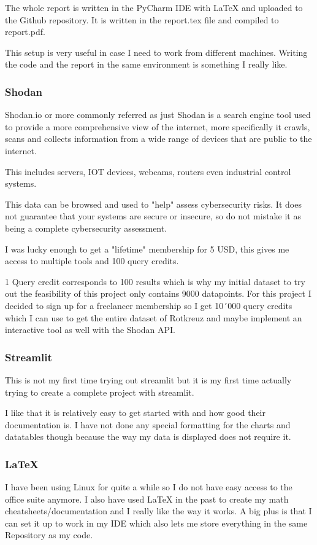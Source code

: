 \documentclass[11pt,a4paper]{article}
\begin{document}
\begin{about}
The whole report is written in the PyCharm IDE with LaTeX and uploaded to the Github repository. It is written in the
report.tex file and compiled to report.pdf.

This setup is very useful in case I need to work from different machines. Writing the code and the report in the same
environment is something I really like.

\newpage

\subsubsection{Shodan}

Shodan.io or more commonly referred as just Shodan is a search engine tool used to provide a more comprehensive view of
the internet, more specifically it crawls, scans and collects information from a wide range of devices that are public to
the internet.

This includes servers, IOT devices, webcams, routers even industrial control systems.

This data can be browsed and used to "help" assess cybersecurity risks. It does not guarantee that your systems are secure or insecure,
so do not mistake it as being a complete cybersecurity assessment.

I was lucky enough to get a "lifetime" membership for 5 USD, this gives me access to multiple tools and 100 query credits.

1 Query credit corresponds to 100 results which is why my initial dataset to try out the feasibility of this project only
contains 9000 datapoints. For this project I decided to sign up for a freelancer membership so I get 10´000 query credits
which I can use to get the entire dataset of Rotkreuz and maybe implement an interactive tool as well with the Shodan API.

\subsubsection{Streamlit}
This is not my first time trying out streamlit but it is my first time actually trying to create a complete project with streamlit.

I like that it is relatively easy to get started with and how good their documentation is. I have not done any special formatting for
the charts and datatables though because the way my data is displayed does not require it.
\end{about}

\subsubsection{LaTeX}
I have been using Linux for quite a while so I do not have easy access to the office suite anymore. I also have used LaTeX in the
past to create my math cheatsheets/documentation and I really like the way it works. A big plus is that I can set it up to work in my
IDE which also lets me store everything in the same Repository as my code.
\newpage
\end{document}
